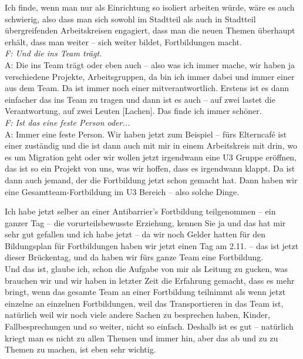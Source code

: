 \begin{linenumbers*}
Ich finde, wenn man nur als Einrichtung so isoliert arbeiten würde, wäre es auch schwierig, also dass man sich sowohl im Stadtteil als auch in Stadtteil übergreifenden Arbeitskreisen engagiert, dass man die neuen Themen überhaupt erhält, dass man weiter -- sich weiter bildet, Fortbildungen macht.\\
\emph{F: Und die ins Team trägt.}\\
A: Die ins Team trägt oder eben auch -- also was ich immer mache, wir haben ja verschiedene Projekte, Arbeitsgruppen, da bin ich immer dabei und immer einer aus dem Team. Da ist immer noch einer mitverantwortlich. Erstens ist es dann einfacher das ins Team zu tragen und dann ist es auch – auf zwei lastet die Verantwortung, auf zwei Leuten {[Lachen]}. Das finde ich immer schöner.\\
\emph{F: Ist das eine feste Person oder...}\\
A: Immer eine feste Person. Wir haben jetzt zum Beispiel -- fürs Elterncafé ist einer zuständig und die ist dann auch mit mir in einem Arbeitskreis mit drin, wo es um Migration geht 
oder wir wollen jetzt irgendwann eine U3 Gruppe eröffnen, das ist so ein Projekt von uns, was wir hoffen, dass es irgendwann klappt. Da ist dann auch jemand, der die Fortbildung jetzt schon gemacht hat. Dann haben wir eine Gesamtteam-Fortbildung im U3 Bereich -- also solche Dinge. 

Ich habe jetzt selber an einer Antibarrier's Fortbildung teilgenommen -- ein ganzer Tag -- die vorurteilsbewusste Erziehung, kennen Sie ja und das hat mir sehr gut gefallen und ich habe jetzt -- da wir noch Gelder hatten für den Bildungsplan für Fortbildungen haben wir jetzt einen Tag am 2.11. – das ist jetzt dieser Brückentag, und da haben wir fürs ganze Team eine Fortbildung.\\
Und das ist, glaube ich, schon die Aufgabe von mir als Leitung zu gucken, was brauchen wir und wir haben in letzter Zeit die Erfahrung gemacht, dass es mehr bringt, wenn das gesamte Team an einer Fortbildung teilnimmt als wenn jetzt einzelne an einzelnen Fortbildungen, weil das Transportieren in das Team ist, natürlich weil wir noch viele andere Sachen zu besprechen haben, Kinder, Fallbesprechungen und so weiter, nicht so einfach. Deshalb ist es gut -- natürlich kriegt man es nicht zu allen Themen und immer hin, aber das ab und zu zu Themen zu machen, ist eben sehr wichtig.  


\end{linenumbers*}
